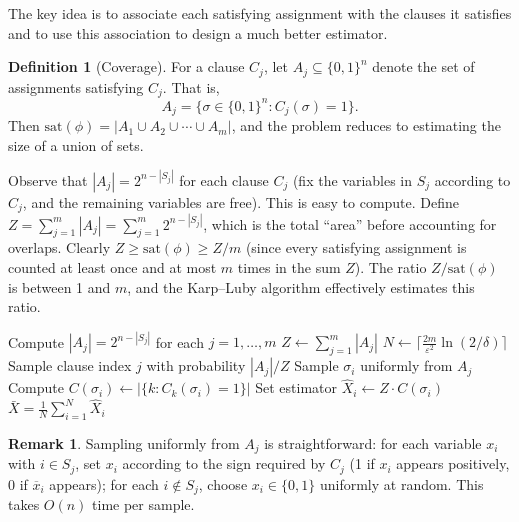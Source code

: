 \documentclass[twoside,12pt]{book}
\theoremstyle{plain}
\theoremstyle{definition}
\newtheorem{definition}[theorem]{Definition}
\newtheorem{remark}[theorem]{Remark}
\theoremstyle{remark}
\begin{document}
The key idea is to associate each satisfying assignment with the clauses it satisfies and to use this association to design a much better estimator.

\begin{definition}[Coverage]
For a clause $C_j$, let $A_j \subseteq \{0,1\}^n$ denote the set of assignments satisfying $C_j$. That is,
\[
A_j = \bigl\{ \sigma \in \{0,1\}^n : C_j(\sigma) = 1 \bigr\}.
\]
Then $\text{sat}(\phi) = |A_1 \cup A_2 \cup \cdots \cup A_m|$, and the problem reduces to estimating the size of a union of sets.
\end{definition}

Observe that $|A_j| = 2^{n - |S_j|}$ for each clause $C_j$ (fix the variables in $S_j$ according to $C_j$, and the remaining variables are free). This is easy to compute. Define $Z = \sum_{j=1}^m |A_j| = \sum_{j=1}^m 2^{n - |S_j|}$, which is the total ``area'' before accounting for overlaps. Clearly $Z \geq \text{sat}(\phi) \geq Z/m$ (since every satisfying assignment is counted at least once and at most $m$ times in the sum $Z$). The ratio $Z/\text{sat}(\phi)$ is between 1 and $m$, and the Karp--Luby algorithm effectively estimates this ratio.

\begin{algorithm}
\caption{Karp--Luby DNF Counting Algorithm}
\label{alg:karpluby}
\begin{algorithmic}[1]
    \State Compute $|A_j| = 2^{n - |S_j|}$ for each $j = 1, \ldots, m$
    \State $Z \gets \sum_{j=1}^m |A_j|$
    \State $N \gets \lceil \frac{2m}{\varepsilon^2} \ln(2/\delta) \rceil$ 
        \State Sample clause index $j$ with probability $|A_j|/Z$
        \State Sample $\sigma_i$ uniformly from $A_j$ 
        \State Compute $C(\sigma_i) \gets |\{k : C_k(\sigma_i) = 1\}|$ 
        \State Set estimator $\hat{X}_i \gets Z \cdot C(\sigma_i)$
    \EndFor
    \State \Return $\bar{X} = \frac{1}{N} \sum_{i=1}^N \hat{X}_i$
\EndFunction
\end{algorithmic}
\end{algorithm}

\begin{remark}
Sampling uniformly from $A_j$ is straightforward: for each variable $x_i$ with $i \in S_j$, set $x_i$ according to the sign required by $C_j$ (1 if $x_i$ appears positively, 0 if $\overline{x}_i$ appears); for each $i \notin S_j$, choose $x_i \in \{0,1\}$ uniformly at random. This takes $O(n)$ time per sample.
\end{remark}
\end{document}
